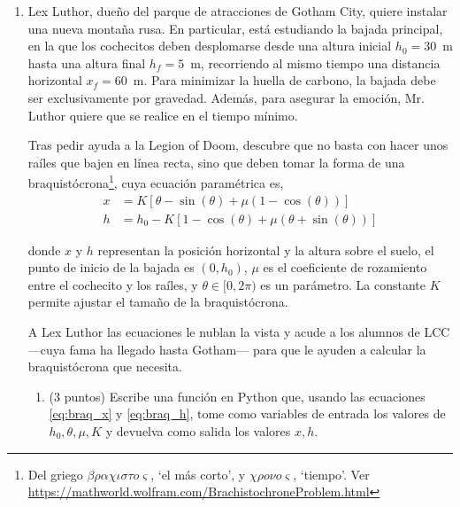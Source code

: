 \begin{enumerate}
	\item Lex Luthor, dueño del parque de atracciones de Gotham City, quiere instalar una nueva montaña rusa. En particular, está estudiando la bajada principal, en la que los cochecitos deben desplomarse desde una altura inicial $h_0=30$~m hasta una altura final $h_f=5$~m, recorriendo al mismo tiempo una distancia horizontal $x_f =60$~m. Para minimizar la huella de carbono, la bajada debe ser exclusivamente por gravedad. Además, para asegurar la emoción, Mr. Luthor quiere que se realice en el tiempo mínimo.

	Tras pedir ayuda a la Legion of Doom, descubre que no basta con hacer unos raíles que bajen en línea recta, sino que deben tomar la forma de una braquistócrona\footnote{Del griego $\beta \rho \alpha \chi \iota  \sigma \tau o \varsigma$, `el más corto', y $\chi \rho o \nu o \varsigma$, `tiempo'. Ver \url{https://mathworld.wolfram.com/BrachistochroneProblem.html}}, cuya ecuación paramétrica es,
	\begin{align}
		x &= K[\theta-\sin(\theta) + \mu(1-\cos(\theta))] \label{eq:braq_x} \\
		h &= h_0 -K[1-\cos(\theta) + \mu(\theta+\sin(\theta))] \label{eq:braq_h}
	\end{align}

	donde $x$ y $h$ representan la posición horizontal y la altura sobre el suelo, el punto de inicio de la bajada es $(0,h_0)$, $\mu$ es el coeficiente de rozamiento entre el cochecito y los raíles, y $\theta \in [0,2\pi)$ es un parámetro. La constante $K$ permite ajustar el tamaño de la braquistócrona.

	A Lex Luthor las ecuaciones le nublan la vista y acude a los alumnos de LCC ---cuya fama ha llegado hasta Gotham--- para que le ayuden a calcular la braquistócrona que necesita.
	\begin{enumerate}
		\item (3 puntos) Escribe una función en Python que, usando las ecuaciones \ref{eq:braq_x} y \ref{eq:braq_h}, tome como variables de entrada los valores de $h_0,\theta, \mu, K$ y devuelva como salida los valores $x,h$.


\end{enumerate}
\end{enumerate}
